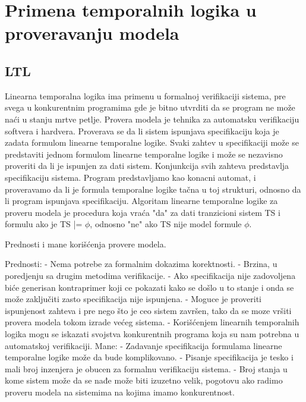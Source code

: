 \documentclass[a4paper]{article}
\begin{document}
	\section{Primena temporalnih logika u proveravanju modela}
	\label{sec:MC}

\subsection{LTL}
	\label{subsec:prLTL}
	Linearna temporalna logika ima primenu u formalnoj verifikaciji sistema, pre svega u konkurentnim programima gde je bitno utvrditi da se program ne može naći u stanju mrtve petlje. 
	Provera modela je tehnika za automatsku verifikaciju softvera i hardvera. Proverava se da li sistem ispunjava specifikaciju koja je zadata formulom linearne temporalne logike. 
	Svaki zahtev u specifikaciji može se predstaviti jednom formulom linearne temporalne logike i može se nezavisno proveriti da li je ispunjen za dati sistem. Konjunkcija svih zahteva predstavlja specifikaciju sistema.
	Program predstavljamo kao konacni automat, i proveravamo da li je formula temporalne logike tačna u toj strukturi, odnosno da li program ispunjava specifikaciju.
	Algoritam linearne temporalne logike za proveru modela je procedura koja vraća "da" za dati tranzicioni sistem TS i formulu \phi ako je TS |= $\phi$, odnosno "ne" ako TS nije model formule $\phi$.

	Prednosti i mane korišćenja provere modela.

	Prednosti: \newline
	- Nema potrebe za formalnim dokazima korektnosti. \newline
	- Brzina, u poredjenju sa drugim metodima verifikacije. \newline
	- Ako specifikacija nije zadovoljena biće generisan kontraprimer koji ce pokazati kako se došlo u to stanje i onda se može zaključiti zasto specifikacija nije ispunjena. \newline
	- Moguce je proveriti ispunjenost zahteva i pre nego što je ceo sistem završen, tako da se moze vršiti provera modela tokom izrade većeg sistema. \newline
	- Korišćenjem linearnih temporalnih logika mogu se iskazati svojstva konkurentnih programa koja su nam potrebna u automatskoj verifikaciji. \newline
	Mane: \newline
	- Zadavanje specifikacija formulama linearne temporalne logike može da bude komplikovano. \newline
	- Pisanje specifikacija je tesko i mali broj inzenjera je obucen za formalnu verifikaciju sistema. \newline
	- Broj stanja u kome sistem može da se nađe može biti izuzetno velik, pogotovu ako radimo proveru modela na sistemima na kojima imamo konkurentnost. \newline
\end{document}
